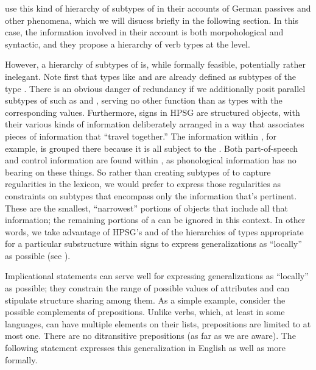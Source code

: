\documentclass[output=paper
                ,modfonts
                ,nonflat
	        ,collection
	        ,collectionchapter
	        ,collectiontoclongg
 	        ,biblatex
                ,babelshorthands
                ,newtxmath
                ,draftmode
                ,colorlinks, citecolor=brown
]{./langsci/langscibook}
\begin{document}
{\citet{AckermanandWebelhuth1998}
 use this kind of hierarchy of subtypes of  in their accounts of German passives and other phenomena, which we will disucss briefly in the following section.
In this case, the information involved in their account is both morpohological and syntactic, and they propose a hierarchy of verb types at the  level.

However, a hierarchy of subtypes of  is, while formally feasible, potentially rather inelegant.
Note first that types like  and  are already defined as subtypes of the type .
There is an obvious danger of redundancy if we additionally posit parallel subtypes of  such as  and  , serving no other function than as types with the corresponding  values.
Furthermore, signs in HPSG are structured objects, with their various kinds of information deliberately arranged in a way that associates pieces of information that ``travel together.''
The information within , for example, is grouped there because it is all subject to the .
Both part-of-speech and control information are found within , as phonological information has no bearing on these things.
So rather than creating subtypes of  to capture regularities in the lexicon, we would prefer to express those regularities as constraints on subtypes that encompass only the information that's pertinent.
These are the smallest, ``narrowest'' portions of  objects that include all that information; the remaining portions of a  can be ignored in this context.
In other words, we take advantage of HPSG's  and of the hierarchies of types appropriate for a particular substructure within signs to express generalizations as ``locally'' as possible (see ).

Implicational statements  can serve well for expressing generalizations as ``locally'' as possible; they constrain the range of possible values of attributes and can stipulate structure sharing among them.
As a simple example, consider the possible complements of prepositions.
Unlike verbs, which, at least in some languages, can have multiple elements on their  lists, prepositions are limited to at most one.
There are no ditransitive prepositions (as far as we are aware).
The following statement expresses this generalization in English as well as more formally.

}
\end{document}
